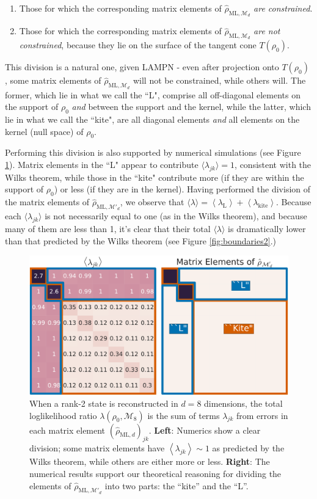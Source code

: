 \documentclass[aps,pra, twocolumn]{revtex4-1}
\newcommand{\M}{\mathcal{M}}
\newcommand{\expect}[1]{\ensuremath{\left\langle#1\right\rangle}}
\newcommand{\rhohat}{\hat{\rho}}
\newcommand{\rhoML}[1]{\rhohat_{\scriptscriptstyle{\mathrm{ML},#1}}}
\begin{document}
\begin{enumerate}[noitemsep]
\item Those for which the corresponding matrix elements of $\rhoML{\M_{d}}$ \emph{are constrained}.
\item Those for which the corresponding matrix elements of $\rhoML{\M_{d}}$ \emph{are not constrained}, because they lie on the surface of the tangent cone $T(\rho_{0})$.
\end{enumerate}
This division is a natural one, given LAMPN - even after projection onto $T(\rho_{0})$ , some matrix elements of $\rhoML{\M_{d}}$ will not be constrained, while others will. The former, which lie in what we call the ``L", comprise all off-diagonal elements on the support of $\rho_0$ \emph{and} between the support and the kernel, while the latter, which lie in what we call the ``kite", are all diagonal elements \emph{and} all elements on the kernel (null space) of $\rho_0$.

Performing this division is also supported by numerical simulations (see Figure \ref{fig:L}). Matrix elements in the ``L" appear to contribute $\langle \lambda_{jk}\rangle = 1$, consistent with the Wilks theorem, while those in the ``kite" contribute more (if they are within the support of $\rho_{0}$) or less (if they are in the kernel).  Having performed the division of the matrix elements of $\rhoML{\M'_{d}}$, we observe that $\langle\lambda\rangle = \expect{\lambda_{\mathrm{L}}} + \expect{\lambda_{\mathrm{kite}}}$. Because each $\langle \lambda_{jk}\rangle$ is not necessarily equal to one (as in the Wilks theorem), and because many of them are less than 1, it's clear that their total $\langle \lambda \rangle$ is dramatically lower than that predicted by the Wilks theorem (see Figure \ref{fig:boundaries2}.)

\begin{figure}[h]
\includegraphics[width=\columnwidth]{Images/Figure_3.pdf}
 \caption{When a rank-2 state is reconstructed in $d=8$ dimensions, the total loglikelihood ratio $\lambda(\rho_0,\mathcal{M}_8)$ is the sum of terms $\lambda_{jk}$ from errors in each matrix element $(\rhoML{d})_{jk}$.  \textbf{Left}:  Numerics show a clear division; some matrix elements have $\expect{\lambda_{jk}}\sim1$ as predicted by the Wilks theorem, while others are either more or less. \textbf{Right}:  The numerical results support our theoretical reasoning for dividing the elements of $\rhoML{\M'_{d}}$ into two parts: the ``kite'' and the ``L''.}
\label{fig:L}
\end{figure}
\end{document}
